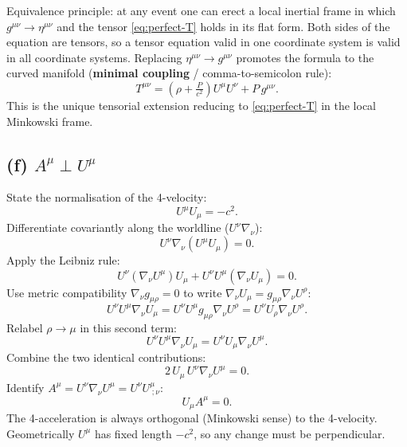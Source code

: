 \documentclass[11pt]{article}
\begin{document}
Equivalence principle: at any event one can erect a local inertial frame in which $g^{\mu\nu}\to\eta^{\mu\nu}$ and the tensor \eqref{eq:perfect-T} holds in its flat form. Both sides of the equation are tensors, so a tensor equation valid in one coordinate system is valid in all coordinate systems. Replacing $\eta^{\mu\nu}\to g^{\mu\nu}$ promotes the formula to the curved manifold (\textbf{minimal coupling} / comma-to-semicolon rule):
\[ \boxed{\;T^{\mu\nu} = \left(\rho + \tfrac{P}{c^2}\right) U^\mu U^\nu + P\,g^{\mu\nu}.\;} \]
This is the unique tensorial extension reducing to \eqref{eq:perfect-T} in the local Minkowski frame.

\subsection*{(f) $A^\mu \perp U^\mu$}

State the normalisation of the 4-velocity:
\[ U^\mu U_\mu = -c^2. \]
Differentiate covariantly along the worldline ($U^\nu\nabla_\nu$):
\[ U^\nu\nabla_\nu (U^\mu U_\mu) = 0. \]
Apply the Leibniz rule:
\[ U^\nu(\nabla_\nu U^\mu)U_\mu + U^\nu U^\mu(\nabla_\nu U_\mu) = 0. \]
Use metric compatibility $\nabla_\nu g_{\mu\rho}=0$ to write $\nabla_\nu U_\mu = g_{\mu\rho}\nabla_\nu U^\rho$:
\[ U^\nu U^\mu \nabla_\nu U_\mu = U^\nu U^\mu g_{\mu\rho}\nabla_\nu U^\rho = U^\nu U_\rho \nabla_\nu U^\rho. \]
Relabel $\rho\to\mu$ in this second term:
\[ U^\nu U^\mu \nabla_\nu U_\mu = U^\nu U_\mu \nabla_\nu U^\mu. \]
Combine the two identical contributions:
\[ 2\,U_\mu\,U^\nu\nabla_\nu U^\mu = 0. \]
Identify $A^\mu = U^\nu\nabla_\nu U^\mu = U^\nu U^\mu_{\;;\nu}$:
\[ \boxed{\;U_\mu A^\mu = 0.\;} \]
The 4-acceleration is always orthogonal (Minkowski sense) to the 4-velocity. Geometrically $U^\mu$ has fixed length $-c^2$, so any change must be perpendicular.
\end{document}
